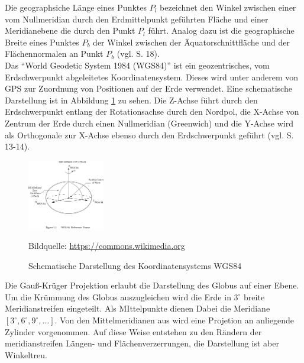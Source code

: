 Die geographsiche Länge eines Punktes $P_l$ bezeichnet den Winkel zwischen einer vom Nullmeridian durch den Erdmittelpunkt geführten Fläche und einer Meridianebene die durch den Punkt $P_l$ führt.
Analog dazu ist die geographische Breite eines Punktes $P_b$ der Winkel zwischen der Äquatorschnittfläche und der Flächennormalen an Punkt $P_b$ (vgl.  \cite{witte2011vermessungskunde} S. 18). 
\\

Das "`World Geodetic System 1984 (WGS84)"' ist ein geozentrisches, vom Erdschwerpunkt abgeleitetes Koordinatensystem. Dieses wird unter anderem von GPS zur Zuordnung von Positionen auf der Erde verwendet. Eine schematische Darstellung ist in Abbildung \ref{fig:wgs84} zu sehen. Die  Z-Achse führt durch den Erdschwerpunkt entlang der Rotationsachse durch den Nordpol, die X-Achse von Zentrum der Erde durch einen Nullmeridian (Greenwich) und die Y-Achse wird als Orthogonale zur X-Achse ebenso durch den Erdschwerpunkt geführt (vgl. \cite{witte2011vermessungskunde} S. 13-14). 


\begin{figure}[h!]
 \centering
 \includegraphics[width=0.3\textwidth, trim={0 9cm 0 3cm},clip]{pix/WGS_84_reference_frame.png}
 \caption[Schematische Darstellung des Koordinatensystems WGS84]
 {Schematische Darstellung des Koordinatensystems WGS84}
 \footnotesize{
    Bildquelle: \href{https://commons.wikimedia.org/wiki/File:WGS_84_reference_frame_(vector_graphic).svg}
                {\url{https://commons.wikimedia.org}}
 }
 \label{fig:wgs84}
\end{figure}



Die Gauß-Krüger Projektion erlaubt die Darstellung des Globus auf einer Ebene. Um die Krümmung des Globus auszugleichen wird die Erde in $3^\circ$ breite Meridianstreifen eingeteilt. Als MIttelpunkte dienen Dabei die Meridiane $[ 3^\circ, 6^\circ, 9^\circ, \dots]$. Von den Mittelmeridianen aus wird eine Projetion an anliegende Zylinder vorgenommen. Auf diese Weise entstehen zu den Rändern der meridianstreifen Längen- und Flächenverzerrungen, die Darstellung ist aber Winkeltreu. 
\\

